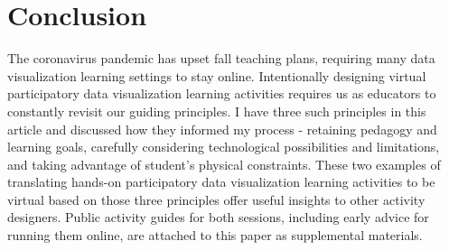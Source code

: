 \documentclass[journal]{vgtc}                %
\begin{document}
\section{Conclusion}
The coronavirus pandemic has upset fall teaching plans, requiring many data visualization learning settings to stay online. Intentionally designing virtual participatory data visualization learning activities requires us as educators to constantly revisit our guiding principles. I have three such principles in this article and discussed how they informed my process - retaining pedagogy and learning goals, carefully considering technological possibilities and limitations, and taking advantage of student's physical constraints. These two examples of translating hands-on participatory data visualization learning activities to be virtual based on those three principles offer useful insights to other activity designers. Public activity guides for both sessions, including early advice for running them online, are attached to this paper as supplemental materials.


%

%
%
%


\end{document}
